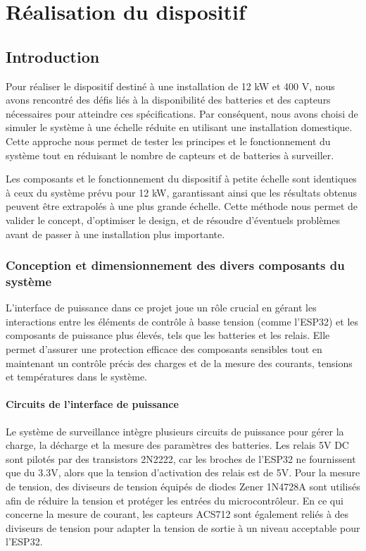 \chapter{Réalisation du dispositif}
\section{Introduction}
Pour réaliser le dispositif destiné à une installation de 12 kW et 400 V, nous avons rencontré des défis liés à la disponibilité des batteries et des capteurs nécessaires pour atteindre ces spécifications. Par conséquent, nous avons choisi de simuler le système à une échelle réduite en utilisant une installation domestique. Cette approche nous permet de tester les principes et le fonctionnement du système tout en réduisant le nombre de capteurs et de batteries à surveiller.

Les composants et le fonctionnement du dispositif à petite échelle sont identiques à ceux du système prévu pour 12 kW, garantissant ainsi que les résultats obtenus peuvent être extrapolés à une plus grande échelle. Cette méthode nous permet de valider le concept, d'optimiser le design, et de résoudre d'éventuels problèmes avant de passer à une installation plus importante.

\subsection{Conception et dimensionnement des divers composants du système}
L'interface de puissance dans ce projet joue un rôle crucial en gérant les interactions entre les éléments de contrôle à basse tension (comme l'ESP32) et les composants de puissance plus élevés, tels que les batteries et les relais. Elle permet d'assurer une protection efficace des composants sensibles tout en maintenant un contrôle précis des charges et de la mesure des courants, tensions et températures dans le système.

\subsubsection{Circuits de l’interface de puissance}

Le système de surveillance intègre plusieurs circuits de puissance pour gérer la charge, la décharge et la mesure des paramètres des batteries. Les relais 5V DC sont pilotés par des transistors 2N2222, car les broches de l'ESP32 ne fournissent que du 3.3V, alors que la tension d'activation des relais est de 5V. Pour la mesure de tension, des diviseurs de tension équipés de diodes Zener 1N4728A sont utilisés afin de réduire la tension et protéger les entrées du microcontrôleur. En ce qui concerne la mesure de courant, les capteurs ACS712 sont également reliés à des diviseurs de tension pour adapter la tension de sortie à un niveau acceptable pour l'ESP32.

